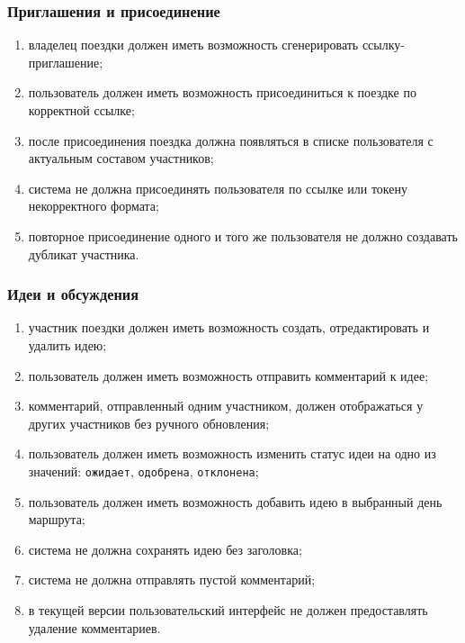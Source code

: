 \documentclass[12pt,a4paper]{article}
\begin{document}
\subsubsection{Приглашения и присоединение}
\begin{enumerate}
  \item владелец поездки должен иметь возможность сгенерировать ссылку-приглашение;
  \item пользователь должен иметь возможность присоединиться к поездке по корректной ссылке;
  \item после присоединения поездка должна появляться в списке пользователя с актуальным составом участников;
  \item система не должна присоединять пользователя по ссылке или токену некорректного формата;
  \item повторное присоединение одного и того же пользователя не должно создавать дубликат участника.
\end{enumerate}

\subsubsection{Идеи и обсуждения}
\begin{enumerate}
  \item участник поездки должен иметь возможность создать, отредактировать и удалить идею;
  \item пользователь должен иметь возможность отправить комментарий к идее;
  \item комментарий, отправленный одним участником, должен отображаться у других участников без ручного обновления;
  \item пользователь должен иметь возможность изменить статус идеи на одно из значений: \texttt{ожидает}, \texttt{одобрена}, \texttt{отклонена};
  \item пользователь должен иметь возможность добавить идею в выбранный день маршрута;
  \item система не должна сохранять идею без заголовка;
  \item система не должна отправлять пустой комментарий;
  \item в текущей версии пользовательский интерфейс не должен предоставлять удаление комментариев.
\end{enumerate}
\end{document}
